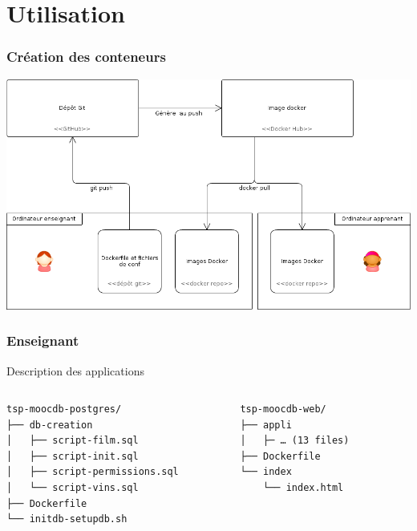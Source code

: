 \documentclass[10pt, compress]{beamer}
\begin{document}
\section{Utilisation}

\begin{frame}[fragile]
  \frametitle{Création des conteneurs}
  \begin{center}
  \includegraphics[scale = 0.35]{infrastructure-creation.png}
   \end{center}
\end{frame}

\begin{frame}[fragile]
  \frametitle{Enseignant}
  
  Description des applications
  
  \begin{columns}[onlytextwidth]
    \begin{column}{0.5\textwidth}
      \begin{verbatim}
tsp-moocdb-postgres/
├── db-creation
│   ├── script-film.sql
│   ├── script-init.sql
│   ├── script-permissions.sql
│   └── script-vins.sql
├── Dockerfile
└── initdb-setupdb.sh
      \end{verbatim}
    \end{column}
    \begin{column}{0.5\textwidth}
      \begin{verbatim}
tsp-moocdb-web/
├── appli
│   ├─ … (13 files)
├── Dockerfile
└── index
    └── index.html
      \end{verbatim}
    \end{column}
​  \end{columns}
\end{frame}
\end{document}
